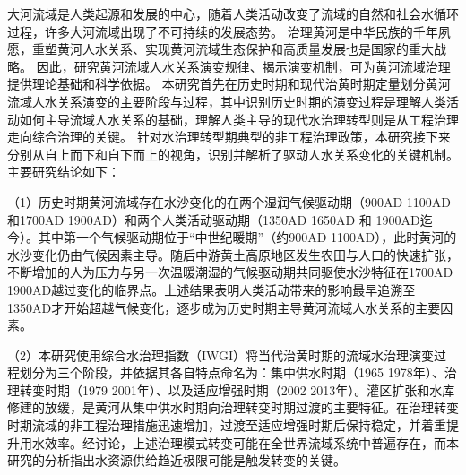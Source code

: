 \begin{cabstract}



大河流域是人类起源和发展的中心，随着人类活动改变了流域的自然和社会水循环过程，许多大河流域出现了不可持续的发展态势。
治理黄河是中华民族的千年夙愿，重塑黄河人\textendash{}水关系、实现黄河流域生态保护和高质量发展也是国家的重大战略。
因此，研究黄河流域人\textendash{}水关系演变规律、揭示演变机制，可为黄河流域治理提供理论基础和科学依据。
本研究首先在历史时期和现代治黄时期定量划分黄河流域人\textendash{}水关系演变的主要阶段与过程，其中识别历史时期的演变过程是理解人类活动如何主导流域人\textendash{}水关系的基础，理解人类主导的现代水治理转型则是从工程治理走向综合治理的关键。
针对水治理转型期典型的非工程治理政策，本研究接下来分别从自上而下和自下而上的视角，识别并解析了驱动人\textendash{}水关系变化的关键机制。主要研究结论如下：

（1）历史时期黄河流域存在水沙变化的在两个湿润气候驱动期（900AD \textendash{} 1100AD和1700AD \textendash{} 1900AD）和两个人类活动驱动期（1350AD \textendash{} 1650AD 和 1900AD迄今）。其中第一个气候驱动期位于“中世纪暖期”（约900AD \textendash{} 1100AD），此时黄河的水沙变化仍由气候因素主导。随后中游黄土高原地区发生农田与人口的快速扩张，不断增加的人为压力与另一次温暖潮湿的气候驱动期共同驱使水沙特征在1700AD \textendash{} 1900AD越过变化的临界点。上述结果表明人类活动带来的影响最早追溯至1350AD才开始超越气候变化，逐步成为历史时期主导黄河流域人\textendash{}水关系的主要因素。

（2）本研究使用综合水治理指数（IWGI）将当代治黄时期的流域水治理演变过程划分为三个阶段，并依据其各自特点命名为：集中供水时期（1965 \textendash{} 1978年）、治理转变时期（1979 \textendash{} 2001年）、以及适应增强时期（2002 \textendash{} 2013年）。灌区扩张和水库修建的放缓，是黄河从集中供水时期向治理转变时期过渡的主要特征。在治理转变时期流域的非工程治理措施迅速增加，过渡至适应增强时期后保持稳定，并着重提升用水效率。经讨论，上述治理模式转变可能在全世界流域系统中普遍存在，而本研究的分析指出水资源供给趋近极限可能是触发转变的关键。


\end{cabstract}
